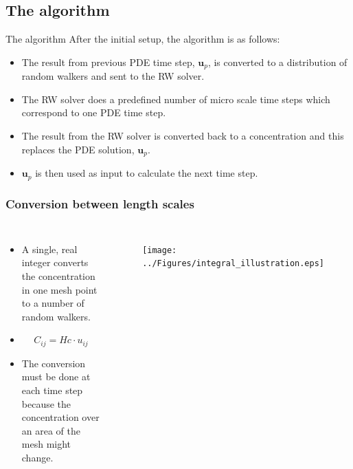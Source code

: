\documentclass[12pt,a4paper, xcolor={usenames,dvipsnames,svgnames,table}]{beamer}
\begin{document}
\subsection{The algorithm}
\begin{frame}[shrink]{The algorithm}
After the initial setup, the algorithm is as follows:
\begin{itemize}
 \item<2-> The result from previous PDE time step, $\mathbf{u}_p$, is converted to a distribution of random walkers and sent to the RW solver.
 \item<3-> The RW solver does a predefined number of micro scale time steps which correspond to one PDE time step.
 \item<4-> The result from the RW solver is converted back to a concentration and this replaces the PDE solution, $\mathbf{u}_p$.
 \item<5-> $\mathbf{u}_p$ is then used as input to calculate the next time step.
\end{itemize}

\end{frame}

\begin{frame}
\frametitle{Conversion between length scales}
\begin{columns}
\begin{itemize}
\item<2-> A single, real integer converts the concentration in one mesh point to a number of random walkers.
\item<3-> \begin{equation*}
            C_{ij} = Hc\cdot u_{ij}
          \end{equation*}
\item<4-> The conversion must be done at each time step because the concentration over an area of the mesh might change.
\end{itemize}
 \begin{figure}[H]
  \centering
\texttt{[image: ../Figures/integral\_illustration.eps]}
  \end{figure}

\end{columns}
\end{frame}
\end{document}
